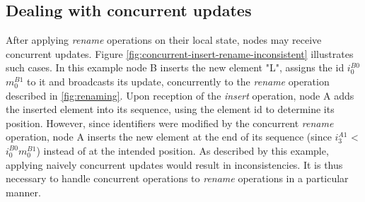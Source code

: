 \documentclass[10pt,journal,compsoc]{IEEEtran}
\newcommand{\trm}[1]{\mathit{#1}}
\newcommand{\id}[3]{$\trm{#1}^{\trm{#2}}_{\trm{#3}}$}
\begin{document}
\subsection{Dealing with concurrent updates}

\label{sec:dealing-with-concurrent-updates}

After applying \emph{rename} operations on their local state, nodes may receive concurrent updates.
Figure \ref{fig:concurrent-insert-rename-inconsistent} illustrates such cases.
In this example node B inserts the new element "L", assigns the id \id{i}{B0}{0}\id{m}{B1}{0} to it and broadcasts its update, concurrently to the \emph{rename} operation described in \autoref{fig:renaming}.
Upon reception of the \emph{insert} operation, node A adds the inserted element into its sequence, using the element id to determine its position.
However, since identifiers were modified by the concurrent \emph{rename} operation, node A inserts the new element at the end of its sequence (since \id{i}{A1}{3} < \id{i}{B0}{0}\id{m}{B1}{0}) instead of at the intended position.
As described by this example, applying naively concurrent updates would result in inconsistencies.
It is thus necessary to handle concurrent operations to \emph{rename} operations in a particular manner.
\end{document}
